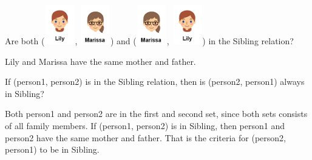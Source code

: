 \documentclass{ximera}
\begin{document}
\begin{exercise}
Are both ({\includegraphics[width=50px,height=65px]{pics/people/lily.png}}, {\includegraphics[width=50px,height=65px]{pics/people/marissa.png}}) and 
({\includegraphics[width=50px,height=65px]{pics/people/marissa.png}}, {\includegraphics[width=50px,height=65px]{pics/people/lily.png}})
in the Sibling relation?

  \begin{multipleChoice}
  \end{multipleChoice}
  \begin{feedback}
Lily and Marissa have the same mother and father.
  \end{feedback}
\end{exercise}






\begin{exercise}
If (person1, person2) is in the Sibling relation, then is (person2, person1) always in Sibling?

  \begin{multipleChoice}
  \end{multipleChoice}
  \begin{feedback}
Both person1 and person2 are in the first and second set, since both sets consists of all family members. If (person1, person2) is in Sibling, then person1 and person2 have the same mother and father. That is the criteria for (person2, person1) to be in Sibling.
  \end{feedback}
\end{exercise}
\end{document}
